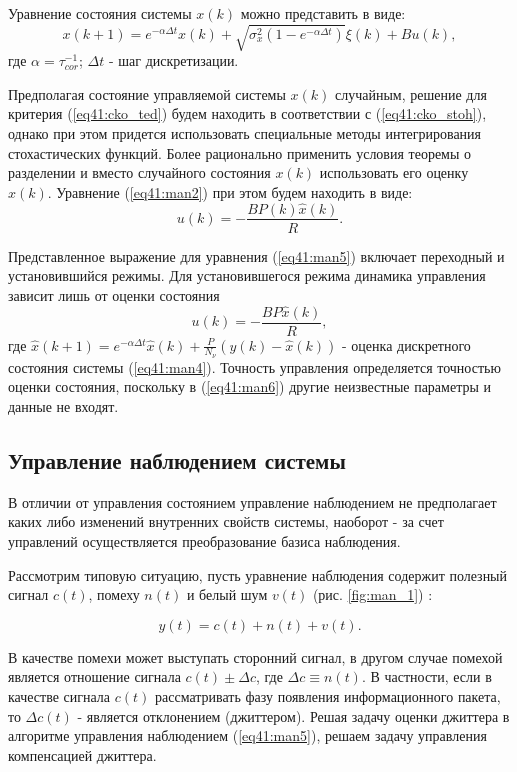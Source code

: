 Уравнение состояния системы $x(k)$ можно представить в виде:
\begin{equation}\label{eq41:man4}
x(k+1)=e^{-\alpha \Delta t}x(k)+\sqrt{\sigma^2_x(1-e^{-\alpha \Delta t})}\xi(k)+Bu(k),
\end{equation}
\noindent где $\alpha=\tau^{-1}_{cor}$; $\Delta t$ - шаг дискретизации.

Предполагая состояние управляемой системы $x(k)$ случайным, решение для критерия (\ref{eq41:cko_ted}) будем находить в соответствии с (\ref{eq41:cko_stoh}), однако при этом придется использовать специальные методы интегрирования стохастических функций.
Более рационально применить условия теоремы о разделении и вместо случайного состояния $x(k)$ использовать его оценку $\hat{x}(k)$. Уравнение (\ref{eq41:man2}) при этом будем находить в виде:
\begin{equation}\label{eq41:man5}
u(k)=-\frac{BP(k)\hat{x}(k)}{R}.
\end{equation}

Представленное выражение для уравнения (\ref{eq41:man5})  включает переходный и установившийся режимы. Для установившегося режима динамика управления зависит лишь от оценки состояния
\begin{equation}\label{eq41:man6}
u(k)=-\frac{BP\hat{x}(k)}{R},
\end{equation}
\noindent где $\hat x (k+1)=e^{-\alpha \Delta t}\hat x(k)+\frac{P}{N_\nu}(y(k)-\hat x(k))$ - оценка дискретного состояния системы (\ref{eq41:man4}).
Точность управления определяется точностью оценки состояния, поскольку в (\ref{eq41:man6}) другие неизвестные параметры и данные не входят.

\subsection{Управление наблюдением системы}

В отличии от управления состоянием управление наблюдением не предполагает каких либо изменений внутренних свойств системы, наоборот - за счет управлений осуществляется преобразование базиса наблюдения.

Рассмотрим типовую ситуацию, пусть уравнение наблюдения содержит полезный сигнал $c(t)$, помеху $n(t)$ и белый шум $v(t)$ (рис. \ref{fig:man_1}) \cite{popovski}:

\begin{equation}\label{eq41:man7}
y(t)=c(t)+n(t)+v(t).
\end{equation}

В качестве помехи может выступать сторонний сигнал, в другом случае помехой является отношение сигнала $c(t)\pm \Delta c$, где $\Delta c\equiv n(t)$. 
В частности, если в качестве сигнала $c(t)$ рассматривать фазу появления информационного пакета, то $\Delta c(t)$ - является отклонением (джиттером).
Решая задачу оценки джиттера в алгоритме управления наблюдением (\ref{eq41:man5}), решаем задачу управления компенсацией джиттера.

